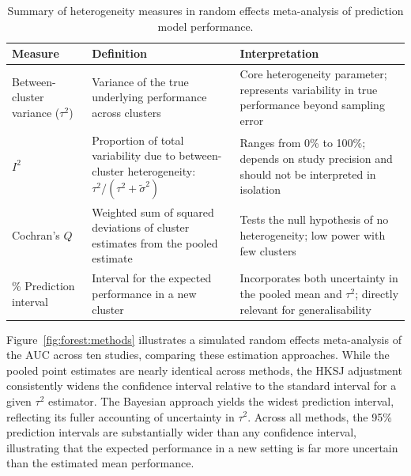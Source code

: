 \begin{table}[htbp]
\centering
\caption[Heterogeneity measures in random effects meta-analysis]{Summary of heterogeneity measures in random effects meta-analysis of prediction model performance.}
\label{tab:intro:heterogeneity}
\begin{tabularx}{\textwidth}{>{\raggedright\arraybackslash}p{} >{\raggedright\arraybackslash}X >{\raggedright\arraybackslash}X}
\toprule
\textbf{Measure} & \textbf{Definition} & \textbf{Interpretation} \\
\midrule
Between-cluster variance ($\tau^2$) & Variance of the true underlying performance across clusters & Core heterogeneity parameter; represents variability in true performance beyond sampling error \\
\addlinespace
$I^2$ & Proportion of total variability due to between-cluster heterogeneity: $\tau^2 / (\tau^2 + \tilde{\sigma}^2)$ & Ranges from 0\% to 100\%; depends on study precision and should not be interpreted in isolation \\
\addlinespace
Cochran's $Q$ & Weighted sum of squared deviations of cluster estimates from the pooled estimate & Tests the null hypothesis of no heterogeneity; low power with few clusters \\
\addlinespace
95\% Prediction interval & Interval for the expected performance in a new cluster & Incorporates both uncertainty in the pooled mean and $\tau^2$; directly relevant for generalisability \\
\bottomrule
\end{tabularx}
\end{table}

Figure~\ref{fig:forest:methods} illustrates a simulated random effects meta-analysis of the \gls{AUC} across ten studies, comparing these estimation approaches. While the pooled point estimates are nearly identical across methods, the HKSJ adjustment consistently widens the confidence interval relative to the standard interval for a given $\tau^2$ estimator. The Bayesian approach yields the widest prediction interval, reflecting its fuller accounting of uncertainty in $\tau^2$. Across all methods, the 95\% prediction intervals are substantially wider than any confidence interval, illustrating that the expected performance in a new setting is far more uncertain than the estimated mean performance.


